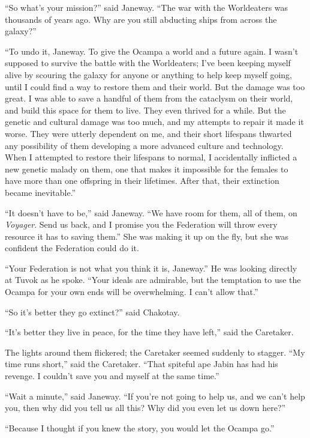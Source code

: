 \documentclass[twoside,letterpaper,12pt]{memoir}
\begin{document}
``So what’s your mission?'' said Janeway. ``The war with the Worldeaters was thousands of years ago. Why are you still abducting ships from across the galaxy?'' 

``To undo it, Janeway. To give the Ocampa a world and a future again. I wasn’t supposed to survive the battle with the Worldeaters; I’ve been keeping myself alive by scouring the galaxy for anyone or anything to help keep myself going, until I could find a way to restore them and their world. But the damage was too great. I was able to save a handful of them from the cataclysm on their world, and build this space for them to live. They even thrived for a while. But the genetic and cultural damage was too much, and my attempts to repair it made it worse. They were utterly dependent on me, and their short lifespans thwarted any possibility of them developing a more advanced culture and technology. When I attempted to restore their lifespans to normal, I accidentally inflicted a new genetic malady on them, one that makes it impossible for the females to have more than one offspring in their lifetimes. After that, their extinction became inevitable.'' 

``It doesn’t have to be,'' said Janeway. ``We have room for them, all of them, on \textit{Voyager}. Send us back, and I promise you the Federation will throw every resource it has to saving them.'' She was making it up on the fly, but she was confident the Federation could do it. 

``Your Federation is not what you think it is, Janeway.'' He was looking directly at Tuvok as he spoke. ``Your ideals are admirable, but the temptation to use the Ocampa for your own ends will be overwhelming. I can’t allow that.'' 

``So it’s better they go extinct?'' said Chakotay. 

``It’s better they live in peace, for the time they have left,'' said the Caretaker. 

The lights around them flickered; the Caretaker seemed suddenly to stagger. ``My time runs short,'' said the Caretaker. ``That spiteful ape Jabin has had his revenge. I couldn’t save you and myself at the same time.'' 

``Wait a minute,'' said Janeway. ``If you’re not going to help us, and we can’t help you, then why did you tell us all this? Why did you even let us down here?'' 

``Because I thought if you knew the story, you would let the Ocampa go.'' 
\end{document}
